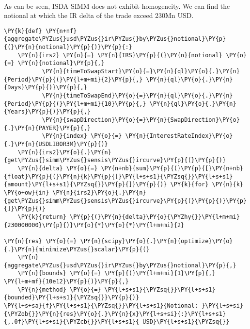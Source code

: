             
            \begin{tcolorbox}[breakable, size=fbox, boxrule=.5pt, pad at break*=1mm, opacityfill=0]
    \begin{center}
    \end{center}
    { \hspace*{\fill} \\}
\end{tcolorbox}
    

    As can be seen, ISDA SIMM does not exhibit homogeneity. We can find the
notional at which the IR delta of the trade exceed 230Mn USD.

    \begin{tcolorbox}[breakable, size=fbox, boxrule=1pt, pad at break*=1mm,colback=cellbackground, colframe=cellborder]
\begin{Verbatim}[commandchars=\\\{\}]
\PY{k}{def} \PY{n+nf}{aggregate\PYZus{}usd\PYZus{}ir\PYZus{}by\PYZus{}notional}\PY{p}{(}\PY{n}{notional}\PY{p}{)}\PY{p}{:}
    \PY{n}{irs2} \PY{o}{=} \PY{n}{IRS}\PY{p}{(}\PY{n}{notional} \PY{o}{=} \PY{n}{notional}\PY{p}{,}
           \PY{n}{timeToSwapStart}\PY{o}{=}\PY{n}{ql}\PY{o}{.}\PY{n}{Period}\PY{p}{(}\PY{l+m+mi}{2}\PY{p}{,} \PY{n}{ql}\PY{o}{.}\PY{n}{Days}\PY{p}{)}\PY{p}{,}
           \PY{n}{timeToSwapEnd}\PY{o}{=}\PY{n}{ql}\PY{o}{.}\PY{n}{Period}\PY{p}{(}\PY{l+m+mi}{10}\PY{p}{,} \PY{n}{ql}\PY{o}{.}\PY{n}{Years}\PY{p}{)}\PY{p}{,}
           \PY{n}{swapDirection}\PY{o}{=}\PY{n}{SwapDirection}\PY{o}{.}\PY{n}{PAYER}\PY{p}{,}
           \PY{n}{index} \PY{o}{=} \PY{n}{InterestRateIndex}\PY{o}{.}\PY{n}{USDLIBOR3M}\PY{p}{)}
    \PY{n}{irs2}\PY{o}{.}\PY{n}{get\PYZus{}simm\PYZus{}sensis\PYZus{}ircurve}\PY{p}{(}\PY{p}{)}
    \PY{n}{delta} \PY{o}{=} \PY{n+nb}{sum}\PY{p}{(}\PY{p}{[}\PY{n+nb}{float}\PY{p}{(}\PY{n}{k}\PY{p}{[}\PY{l+s+s1}{\PYZsq{}}\PY{l+s+s1}{amount}\PY{l+s+s1}{\PYZsq{}}\PY{p}{]}\PY{p}{)} \PY{k}{for} \PY{n}{k} \PY{o+ow}{in} \PY{n}{irs2}\PY{o}{.}\PY{n}{get\PYZus{}simm\PYZus{}sensis\PYZus{}ircurve}\PY{p}{(}\PY{p}{)}\PY{p}{]}\PY{p}{)}
    \PY{k}{return} \PY{p}{(}\PY{n}{delta}\PY{o}{\PYZhy{}}\PY{l+m+mi}{230000000}\PY{p}{)}\PY{o}{*}\PY{o}{*}\PY{l+m+mi}{2}

\PY{n}{res} \PY{o}{=} \PY{n}{scipy}\PY{o}{.}\PY{n}{optimize}\PY{o}{.}\PY{n}{minimize\PYZus{}scalar}\PY{p}{(}
    \PY{n}{aggregate\PYZus{}usd\PYZus{}ir\PYZus{}by\PYZus{}notional}\PY{p}{,}
    \PY{n}{bounds} \PY{o}{=} \PY{p}{(}\PY{l+m+mi}{1}\PY{p}{,} \PY{l+m+mf}{10e12}\PY{p}{)}\PY{p}{,}
    \PY{n}{method} \PY{o}{=} \PY{l+s+s1}{\PYZsq{}}\PY{l+s+s1}{bounded}\PY{l+s+s1}{\PYZsq{}}\PY{p}{)}
\PY{l+s+sa}{f}\PY{l+s+s1}{\PYZsq{}}\PY{l+s+s1}{Notional: }\PY{l+s+si}{\PYZob{}}\PY{n}{res}\PY{o}{.}\PY{n}{x}\PY{l+s+si}{:}\PY{l+s+s1}{,.0f}\PY{l+s+si}{\PYZcb{}}\PY{l+s+s1}{ USD}\PY{l+s+s1}{\PYZsq{}}
\end{Verbatim}
\end{tcolorbox}

